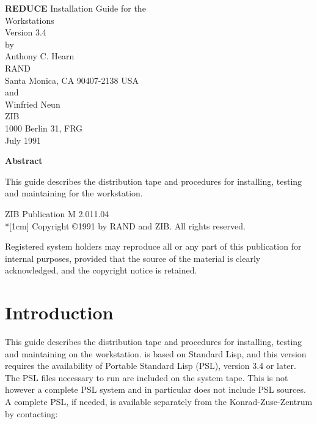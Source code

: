 \begin{titlepage}
\samepage
\begin{center}
\begin{minipage}{10cm}
\begin{center}
{\LARGE {\bf REDUCE} Installation Guide for the} \vspace*{2mm} \\
{\LARGE {\system} Workstations} \\[0.3cm]
{\LARGE Version 3.4} \\[0.3cm]
{\large by} \\[0.3cm]
{\Large Anthony C. Hearn}\\
{\large RAND} \\
{\large Santa Monica, CA 90407-2138 USA} \\[0.3cm]
{\large and} \\[0.3cm]
{\Large Winfried Neun}\\
{\large ZIB} \\
{\large 1000 Berlin 31, FRG} \\[0.3cm]
{\large July 1991}\\[0.5cm]
\vfill

{\bf Abstract}
\end{center}
\end{minipage}
\end{center}
This guide describes the {\REDUCE} distribution tape and procedures for
installing, testing and maintaining {\REDUCE} for the {\system} workstation.

\begin{center}
{ZIB Publication M 2.011.04} \\*[1cm]
Copyright \copyright 1991 by RAND and ZIB.  All rights reserved.
\end{center}

\nopagebreak
Registered system holders may reproduce all or any part of this
publication for internal purposes, provided that the source of the
material is clearly acknowledged, and the copyright notice is retained.
\end{titlepage}
\newpage
\tableofcontents
\thispagestyle{empty}

\newpage
\setcounter{page}{1}
\pagestyle{plain}

\section{Introduction}
This guide describes the {\REDUCE} distribution tape and procedures for
installing, testing and maintaining {\REDUCE} on the {\system} workstation.
{\REDUCE} is based on Standard Lisp, and this version requires the
availability of Portable Standard Lisp (PSL), version 3.4 or later.  The
PSL files necessary to run {\REDUCE} are included on the system tape.  This
is not however a complete PSL system and in particular does not include
PSL sources.  A complete PSL, if needed, is available separately from the
Konrad-Zuse-Zentrum by contacting:

